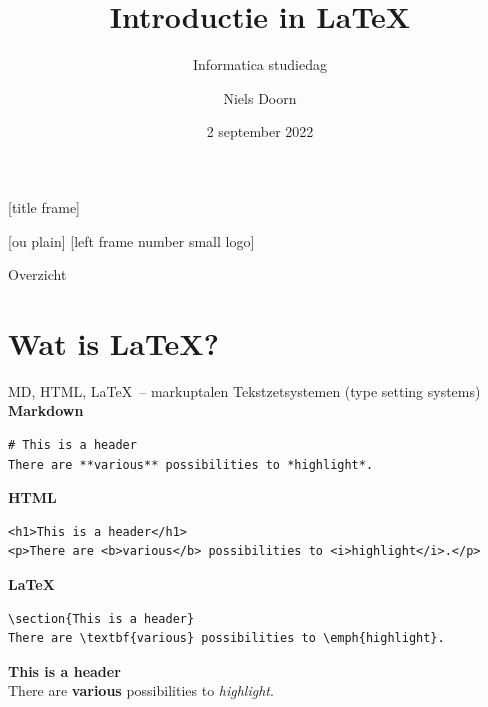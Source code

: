 \documentclass{beamer}
\title{Introductie in \LaTeX}
\subtitle{Informatica studiedag}
\author{Niels Doorn}
\date{2 september 2022}
\begin{document}
[title frame]
\begin{frame}
  \titlepage
\end{frame}

[ou plain]
[left frame number small logo]

\begin{frame}{Overzicht}
\tableofcontents[hideallsubsections]
\end{frame}


\section{Wat is \LaTeX?}

\begin{frame}[fragile]{MD, HTML, \LaTeX\ -- markuptalen}
Tekstzetsystemen (type setting systems)
\pause
\\
\textbf{Markdown}
\begin{verbatim}
# This is a header
There are **various** possibilities to *highlight*.
\end{verbatim}
\pause
\textbf{HTML}
\begin{verbatim}
<h1>This is a header</h1>
<p>There are <b>various</b> possibilities to <i>highlight</i>.</p>
\end{verbatim}
\pause
\textbf{\LaTeX}
\begin{verbatim}
\section{This is a header}
There are \textbf{various} possibilities to \emph{highlight}.
\end{verbatim}
\pause
\begin{tcolorbox}
 {\Large {\bf This is a header}}\\
 There are \textbf{various} possibilities to \emph{highlight}.
\end{tcolorbox}

\end{frame}
\end{document}
